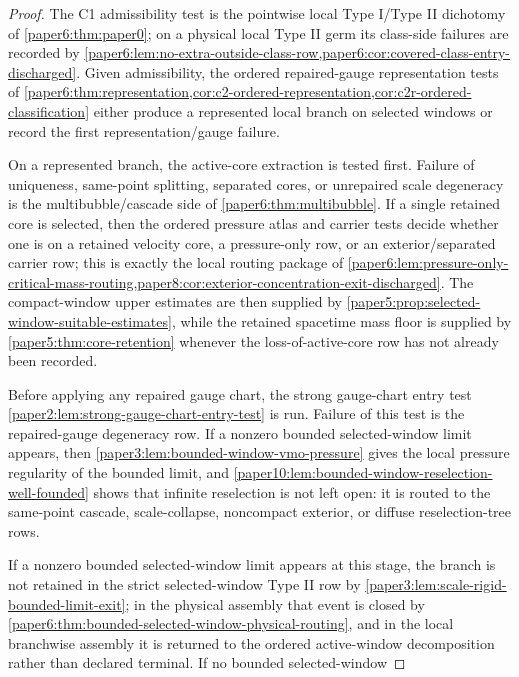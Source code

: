 \documentclass[11pt]{amsart}
\theoremstyle{plain}
\theoremstyle{definition}
\theoremstyle{remark}
\begin{document}
\begin{proof}
The C1 admissibility test is the pointwise local Type I/Type II dichotomy of
\cref{paper6:thm:paper0}; on a physical local Type II germ its class-side
failures are recorded by
\cref{paper6:lem:no-extra-outside-class-row,paper6:cor:covered-class-entry-discharged}.
Given admissibility, the ordered repaired-gauge representation tests of
\cref{paper6:thm:representation,cor:c2-ordered-representation,cor:c2r-ordered-classification}
either produce a represented local branch on selected windows or record the
first representation/gauge failure.
\par
On a represented branch, the active-core extraction is tested first.  Failure
of uniqueness, same-point splitting, separated cores, or unrepaired scale
degeneracy is the multibubble/cascade side of
\cref{paper6:thm:multibubble}.  If a single retained core is selected, then the
ordered pressure atlas and carrier tests decide whether one is on a retained
velocity core, a pressure-only row, or an exterior/separated carrier row; this
is exactly the local routing package of
\cref{paper6:lem:pressure-only-critical-mass-routing,paper8:cor:exterior-concentration-exit-discharged}.
The compact-window upper estimates are then supplied by
\cref{paper5:prop:selected-window-suitable-estimates}, while the retained
spacetime mass floor is supplied by \cref{paper5:thm:core-retention}
whenever the loss-of-active-core row has not already been recorded.
\par
Before applying any repaired gauge chart, the strong gauge-chart entry test
\cref{paper2:lem:strong-gauge-chart-entry-test} is run.  Failure of this test
is the repaired-gauge degeneracy row.  If a nonzero bounded selected-window
limit appears, then \cref{paper3:lem:bounded-window-vmo-pressure} gives the
local pressure regularity of the bounded limit, and
\cref{paper10:lem:bounded-window-reselection-well-founded} shows that
infinite reselection is not left open: it is routed to the same-point cascade,
scale-collapse, noncompact exterior, or diffuse reselection-tree rows.
\par
If a nonzero bounded selected-window limit appears at this stage, the branch is
not retained in the strict selected-window Type II row by
\cref{paper3:lem:scale-rigid-bounded-limit-exit}; in the physical assembly that
event is closed by \cref{paper6:thm:bounded-selected-window-physical-routing}, and in
the local branchwise assembly it is returned to the ordered active-window
decomposition rather than declared terminal.  If no bounded selected-window

\end{proof}
\end{document}
